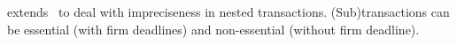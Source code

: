 \documentclass[letter]{sig-alternate}
\begin{document}
\cite{1530682} extends~\cite{1420972} to deal with impreciseness in nested transactions. (Sub)transactions can be essential (with firm deadlines) and non-essential (without firm deadline). 
\end{document}
